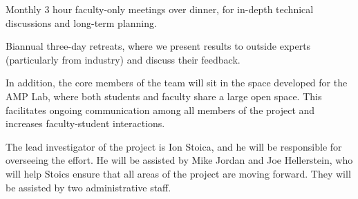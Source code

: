 \1  Monthly 3 hour faculty-only meetings over dinner, for in-depth technical discussions and long-term planning.

\1  Biannual three-day retreats, where we present results to outside experts (particularly from industry) and discuss their feedback.

\0

In addition, the core members of the team will sit in the space developed for the AMP Lab, where both students and faculty share a large open space.  This facilitates ongoing communication among all members of the project and increases faculty-student interactions.

The lead investigator of the project is Ion Stoica, and he will be responsible for overseeing the effort.  He will be assisted by Mike Jordan and Joe Hellerstein, who will help Stoics ensure that all areas of the project are moving forward.  They will be assisted by two administrative staff.

